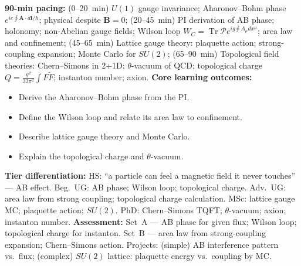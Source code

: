 \documentclass[11pt,a4paper]{article}
\begin{document}
\begin{tcolorbox}[modulebox, title={Module~II.2 / L10: Gauge Fields and Topological Effects}]
\textbf{90-min pacing:} (0--20~min) $U(1)$ gauge invariance; Aharonov--Bohm phase $e^{ie\oint\mathbf{A}\cdot d\mathbf{l}/\hbar}$; physical despite $\mathbf{B}=0$; (20--45~min) PI derivation of AB phase; holonomy; non-Abelian gauge fields; Wilson loop $W_C=\operatorname{Tr}\mathcal{P}e^{ig\oint A_\mu dx^\mu}$; area law and confinement; (45--65~min) Lattice gauge theory: plaquette action; strong-coupling expansion; Monte Carlo for $SU(2)$; (65--90~min) Topological field theories: Chern--Simons in 2+1D; $\theta$-vacuum of QCD; topological charge $Q=\tfrac{g^2}{32\pi^2}\int F\tilde{F}$; instanton number; axion.
\medskip\textbf{Core learning outcomes:}
\begin{itemize}[leftmargin=1.4em,topsep=2pt,itemsep=1pt]
  \item Derive the Aharonov--Bohm phase from the PI.
  \item Define the Wilson loop and relate its area law to confinement.
  \item Describe lattice gauge theory and Monte Carlo.
  \item Explain the topological charge and $\theta$-vacuum.
\end{itemize}
\medskip\textbf{Tier differentiation:}
HS: ``a particle can feel a magnetic field it never touches'' --- AB effect.
Beg.\ UG: AB phase; Wilson loop; topological charge.
Adv.\ UG: area law from strong coupling; topological charge calculation.
MSc: lattice gauge MC; plaquette action; $SU(2)$.
PhD: Chern--Simons TQFT; $\theta$-vacuum; axion; instanton number.
\medskip\textbf{Assessment:}
Set~A --- AB phase for given flux; Wilson loop; topological charge for instanton.
Set~B --- area law from strong-coupling expansion; Chern--Simons action.
Projects: (simple) AB interference pattern vs.\ flux; (complex) $SU(2)$ lattice: plaquette energy vs.\ coupling by MC.
\end{tcolorbox}

\medskip
\end{document}
